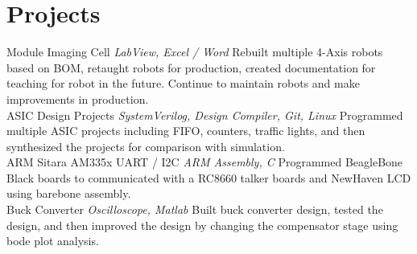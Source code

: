 \documentclass[letterpaper]{moderncv}        %
\begin{document}
\section{Projects}
\cventry
{}
{Module Imaging Cell}
{}
{\textit{LabView, Excel / Word}}
{}
{Rebuilt multiple 4-Axis robots based on BOM, retaught robots for production, created documentation for teaching for robot in the future. Continue to maintain robots and make improvements in production.\\}
	\vspace{1mm}
	\cventry
	{}
	{ASIC Design Projects}
	{}
	{\textit{SystemVerilog, Design Compiler, Git, Linux}}
	{}
	{Programmed multiple ASIC projects including FIFO, counters, traffic lights, and then synthesized the projects for comparison with simulation.\\}
		\vspace{1mm}
		\cventry
		{}
		{ARM Sitara AM335x UART / I2C}
		{}
		{\textit{ARM Assembly, C}}
		{}
		{Programmed BeagleBone Black boards to communicated with a RC8660 talker boards and NewHaven LCD using barebone assembly.\\}
			\vspace{1mm}
			\cventry
			{}
			{Buck Converter}
			{}
			{\textit{Oscilloscope, Matlab}}
			{}
			{Built buck converter design, tested the design, and then improved the design by changing the compensator stage using bode plot analysis.\\}
				\vspace{1mm}
				
				\ 
\end{document}
